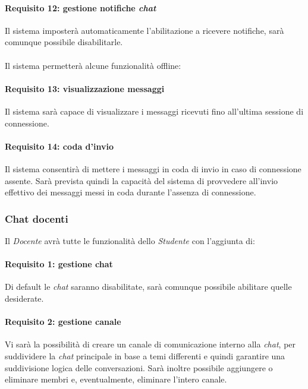 \paragraph{Requisito 12: gestione notifiche \emph{chat}\\}
Il sistema imposterà automaticamente l’abilitazione a ricevere notifiche, sarà comunque possibile disabilitarle.\\
\\

Il sistema permetterà alcune funzionalità offline:

\paragraph{Requisito 13: visualizzazione messaggi\\}
Il sistema sarà capace di visualizzare i messaggi ricevuti fino all’ultima sessione di connessione.

\paragraph{Requisito 14: coda d'invio\\}
Il sistema consentirà di mettere i messaggi in coda di invio in caso di connessione assente. Sarà prevista quindi la capacità del sistema di provvedere all’invio effettivo dei messaggi messi in coda durante l’assenza di connessione.

\subsubsection{Chat docenti}
Il \emph{Docente} avrà tutte le funzionalità dello \emph{Studente} con l’aggiunta di:

\paragraph{Requisito 1: gestione chat\\}
Di default le \emph{chat} saranno disabilitate, sarà comunque possibile abilitare quelle desiderate.

\paragraph{Requisito 2: gestione canale\\}
Vi sarà la possibilità di creare un canale di comunicazione interno alla \emph{chat}, per suddividere la \emph{chat} principale in base a temi differenti e quindi garantire una suddivisione logica delle conversazioni. Sarà inoltre possibile aggiungere o eliminare membri e, eventualmente, eliminare l’intero canale.

